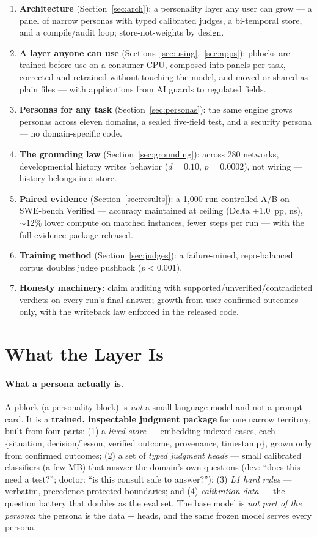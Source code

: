 \documentclass[11pt]{article}
\begin{document}
\begin{enumerate}
  \item \textbf{Architecture} (Section~\ref{sec:arch}): a personality layer any user can grow --- a panel of narrow personas with typed calibrated judges, a bi-temporal store, and a compile/audit loop; store-not-weights by design.
  \item \textbf{A layer anyone can use} (Sections~\ref{sec:using},~\ref{sec:apps}): pblocks are trained before use on a consumer CPU, composed into panels per task, corrected and retrained without touching the model, and moved or shared as plain files --- with applications from AI guards to regulated fields.
  \item \textbf{Personas for any task} (Section~\ref{sec:personas}): the same engine grows personas across eleven domains, a sealed five-field test, and a security persona --- no domain-specific code.
  \item \textbf{The grounding law} (Section~\ref{sec:grounding}): across 280 networks, developmental history writes behavior ($d{=}0.10$, $p{=}0.0002$), not wiring --- history belongs in a store.
  \item \textbf{Paired evidence} (Section~\ref{sec:results}): a 1{,}000-run controlled A/B on SWE-bench Verified --- accuracy maintained at ceiling (Delta +1.0~pp, ns), ${\sim}12\%$ lower compute on matched instances, fewer steps per run --- with the full evidence package released.
  \item \textbf{Training method} (Section~\ref{sec:judges}): a failure-mined, repo-balanced corpus doubles judge pushback ($p{<}0.001$).
  \item \textbf{Honesty machinery}: claim auditing with supported/unverified/contradicted verdicts on every run's final answer; growth from user-confirmed outcomes only, with the writeback law enforced in the released code.
\end{enumerate}

\section{What the Layer Is}
\label{sec:what}

\paragraph{What a persona actually is.} A pblock (a personality block) is \emph{not} a small language model and not a prompt card. It is a \textbf{trained, inspectable judgment package} for one narrow territory, built from four parts: (1) a \emph{lived store} --- embedding-indexed cases, each \{situation, decision/lesson, verified outcome, provenance, timestamp\}, grown only from confirmed outcomes; (2) a set of \emph{typed judgment heads} --- small calibrated classifiers (a few MB) that answer the domain's own questions (dev: ``does this need a test?''; doctor: ``is this consult safe to answer?''); (3) \emph{L1 hard rules} --- verbatim, precedence-protected boundaries; and (4) \emph{calibration data} --- the question battery that doubles as the eval set. The base model is \emph{not part of the persona}: the persona is the data + heads, and the same frozen model serves every persona.
\end{document}
